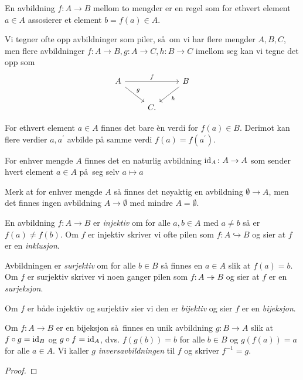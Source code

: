 \begin{definition}
    En avbildning $f\colon A\to B$ mellom to mengder er en
    regel som for ethvert element $a\in A$ assosierer et element
    $b = f(a)\in A$.

    Vi tegner ofte opp avbildninger som piler,
    så om vi har flere mengder $A, B, C$, men flere avbildninger
    $f\colon A\to B, g\colon A\to C, h\colon B\to C$
    imellom seg kan vi tegne det opp som
    \[
        \begin{tikzcd}
            A
            \ar{rr}{f}
            \ar{rd}{g}
            &&
            B
            \ar{ld}{h}
            \\
            &
            C.
        \end{tikzcd}
    \]
\end{definition}

For ethvert element $a\in A$ finnes det bare \`en verdi for $f(a)\in B$.
Derimot kan flere verdier $a, a^\prime$ avbilde på samme verdi
$f(a) = f(a^\prime)$.

\begin{example}
    For enhver mengde $A$ finnes det en naturlig avbildning
    $\operatorname{id}_A\colon A\to A$ som sender hvert element $a\in A$
    på seg selv $a\mapsto a$
\end{example}

\begin{remark}
    Merk at for enhver mengde $A$ så finnes det
    nøyaktig en avbildning $\emptyset \to A$,
    men det finnes ingen avbildning $A\to \emptyset$ med mindre $A = \emptyset$.
\end{remark}

\begin{definition}
    En avbildning $f\colon A\to B$ er \textit{injektiv} om for alle $a,b\in A$ med $a\neq b$
    så er $f(a)\neq f(b)$.
    Om $f$ er injektiv skriver vi ofte pilen som $f\colon A\hookrightarrow B$
    og sier at $f$ er en \textit{inklusjon}.

    Avbildningen er \textit{surjektiv} om for alle $b\in B$ så finnes en $a\in A$
    slik at $f(a) = b$.
    Om $f$ er surjektiv skriver vi noen ganger pilen som
    $f\colon A\twoheadrightarrow B$ og sier at $f$ er en \textit{surjeksjon}.

    Om $f$ er både injektiv og surjektiv sier vi den er \textit{bijektiv}
    og sier $f$ er en \textit{bijeksjon}.
\end{definition}

\begin{lemma}
    Om $f\colon A\to B$ er en bijeksjon så finnes en unik avbildning
    $g\colon B\to A$ slik at $f\circ g = \operatorname{id}_B$ og $g\circ f = \operatorname{id}_A$,
    dvs.
    $f(g(b)) = b$ for alle $b\in B$ og $g(f(a)) = a$ for alle $a\in A$.
    Vi kaller $g$ \textit{inversavbildningen} til $f$ og skriver $f^{-1} = g$.
\end{lemma}
\begin{proof}
\end{proof}

